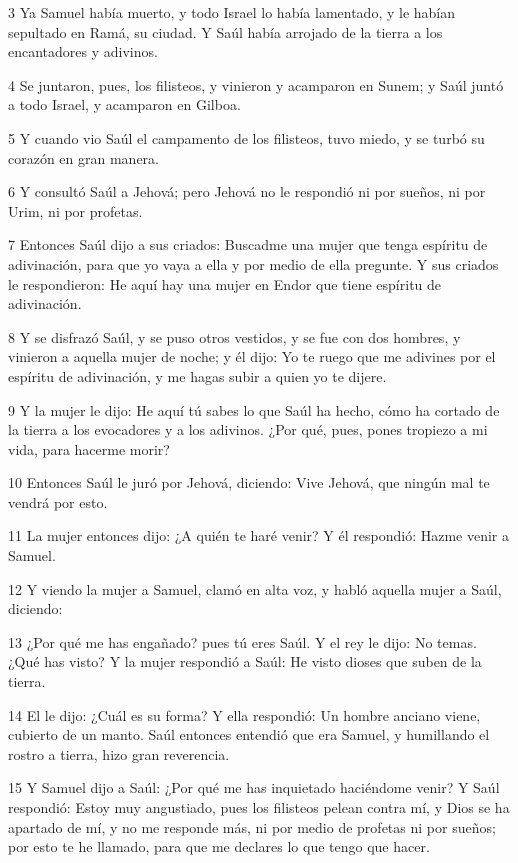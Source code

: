 {\par 3 Ya Samuel había muerto, y todo Israel lo había lamentado, y le habían sepultado en Ramá, su ciudad. Y Saúl había arrojado de la tierra a los encantadores y adivinos. 
\par 4 Se juntaron, pues, los filisteos, y vinieron y acamparon en Sunem; y Saúl juntó a todo Israel, y acamparon en Gilboa.
\par 5 Y cuando vio Saúl el campamento de los filisteos, tuvo miedo, y se turbó su corazón en gran manera.
\par 6 Y consultó Saúl a Jehová; pero Jehová no le respondió ni por sueños, ni por Urim, ni por profetas.
\par 7 Entonces Saúl dijo a sus criados: Buscadme una mujer que tenga espíritu de adivinación, para que yo vaya a ella y por medio de ella pregunte. Y sus criados le respondieron: He aquí hay una mujer en Endor que tiene espíritu de adivinación.
\par 8 Y se disfrazó Saúl, y se puso otros vestidos, y se fue con dos hombres, y vinieron a aquella mujer de noche; y él dijo: Yo te ruego que me adivines por el espíritu de adivinación, y me hagas subir a quien yo te dijere.
\par 9 Y la mujer le dijo: He aquí tú sabes lo que Saúl ha hecho, cómo ha cortado de la tierra a los evocadores y a los adivinos. ¿Por qué, pues, pones tropiezo a mi vida, para hacerme morir?
\par 10 Entonces Saúl le juró por Jehová, diciendo: Vive Jehová, que ningún mal te vendrá por esto.
\par 11 La mujer entonces dijo: ¿A quién te haré venir? Y él respondió: Hazme venir a Samuel.
\par 12 Y viendo la mujer a Samuel, clamó en alta voz, y habló aquella mujer a Saúl, diciendo: 
\par 13 ¿Por qué me has engañado? pues tú eres Saúl. Y el rey le dijo: No temas. ¿Qué has visto? Y la mujer respondió a Saúl: He visto dioses que suben de la tierra.
\par 14 El le dijo: ¿Cuál es su forma? Y ella respondió: Un hombre anciano viene, cubierto de un manto. Saúl entonces entendió que era Samuel, y humillando el rostro a tierra, hizo gran reverencia.
\par 15 Y Samuel dijo a Saúl: ¿Por qué me has inquietado haciéndome venir? Y Saúl respondió: Estoy muy angustiado, pues los filisteos pelean contra mí, y Dios se ha apartado de mí, y no me responde más, ni por medio de profetas ni por sueños; por esto te he llamado, para que me declares lo que tengo que hacer.
}
